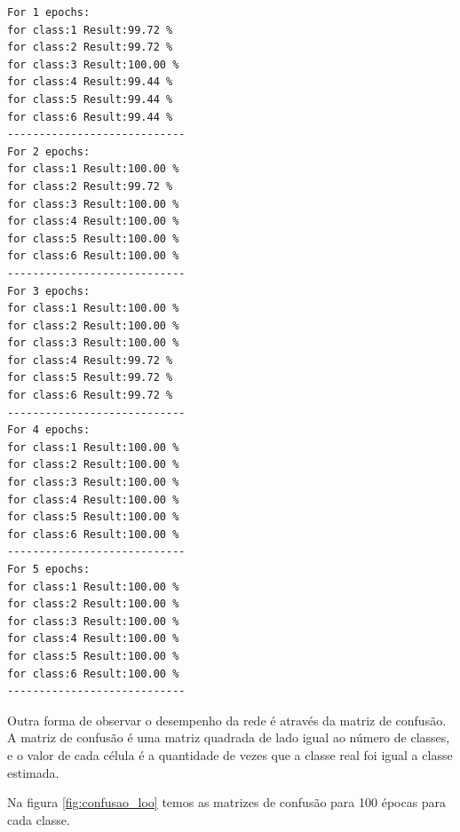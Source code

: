 \documentclass[paper=a4, fontsize=11pt]{scrartcl}
\numberwithin{equation}{section}		%
\numberwithin{figure}{section}			%
\numberwithin{table}{section}				%
\begin{document}
	\begin{multicols}{2}
    	\begin{verbatim}
For 1 epochs:
for class:1 Result:99.72 %
for class:2 Result:99.72 %
for class:3 Result:100.00 %
for class:4 Result:99.44 %
for class:5 Result:99.44 %
for class:6 Result:99.44 %
----------------------------
For 2 epochs:
for class:1 Result:100.00 %
for class:2 Result:99.72 %
for class:3 Result:100.00 %
for class:4 Result:100.00 %
for class:5 Result:100.00 %
for class:6 Result:100.00 %
----------------------------
For 3 epochs:
for class:1 Result:100.00 %
for class:2 Result:100.00 %
for class:3 Result:100.00 %
for class:4 Result:99.72 %
for class:5 Result:99.72 %
for class:6 Result:99.72 %
----------------------------
For 4 epochs:
for class:1 Result:100.00 %
for class:2 Result:100.00 %
for class:3 Result:100.00 %
for class:4 Result:100.00 %
for class:5 Result:100.00 %
for class:6 Result:100.00 %
----------------------------
For 5 epochs:
for class:1 Result:100.00 %
for class:2 Result:100.00 %
for class:3 Result:100.00 %
for class:4 Result:100.00 %
for class:5 Result:100.00 %
for class:6 Result:100.00 %	
----------------------------
    	\end{verbatim}
	\end{multicols}
	

	
	Outra forma de observar o desempenho da rede é através da matriz de confusão. A matriz de confusão é uma matriz quadrada de lado igual ao número de classes, e o valor de cada célula é a quantidade de vezes que a classe real foi igual a classe estimada.
	
	Na figura \ref{fig:confusao_loo} temos as matrizes de confusão para 100 épocas para cada classe.
	
\end{document}
